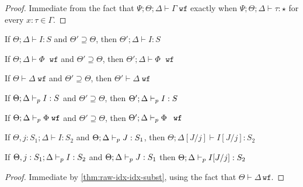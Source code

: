 \ctxwfstreng*
\begin{proof}
Immediate from the fact that $\Psi ; \Theta ; \Delta \vdash \Gamma \; \texttt{wf}$ exactly when $\Psi ; \Theta ; \Delta \vdash \tau : \star$ for every $x : \tau \in \Gamma$.
\end{proof}

\conwfstreng*

\begin{theorem}
If $\Theta ; \Delta \vdash I : S$ and $\Theta' \supseteq \Theta$, then $\Theta' ; \Delta \vdash I : S$
\end{theorem}

\begin{theorem}
If $\Theta ; \Delta \vdash \Phi \; \texttt{ wf}$ and $\Theta' \supseteq \Theta$, then $\Theta' ; \Delta \vdash \Phi \; \texttt{ wf}$
\end{theorem}

\begin{theorem}
If $\Theta \vdash \Delta \; \texttt{wf}$ and $\Theta' \supseteq \Theta$, then $\Theta' \vdash \Delta \; \texttt{wf}$
\end{theorem}

\begin{theorem}
If $\Theta ; \Delta \vdash_p I : S$ and $\Theta' \supseteq \Theta$, then $\Theta' ; \Delta \vdash_p I : S$
\end{theorem}

\begin{theorem}
If $\Theta ; \Delta \vdash_p \Phi \; \texttt{wf}$ and $\Theta' \supseteq \Theta$, then $\Theta' ; \Delta \vdash_p \Phi \; \texttt{ wf}$
\end{theorem}

\begin{theorem}
If $\Theta, j : S_1 ; \Delta \vdash I : S_2$ and $\Theta ; \Delta \vdash_p J : S_1$, then 
$\Theta ; \Delta[J/j] \vdash I[J/j] : S_2$
\label{thm:raw-idx-idx-subst}
\end{theorem}


\begin{theorem}
If $\Theta, j : S_1 ; \Delta \vdash_p I : S_2$ and $\Theta ; \Delta \vdash_p J : S_1$ then $\Theta ; \Delta \vdash_p I[J/j] : S_2$
\label{thm:idx-idx-subst}
\end{theorem}
\begin{proof}
Immediate by \autoref{thm:raw-idx-idx-subst}, using the fact that $\Theta \vdash \Delta \, \texttt{wf}$.
\end{proof}

